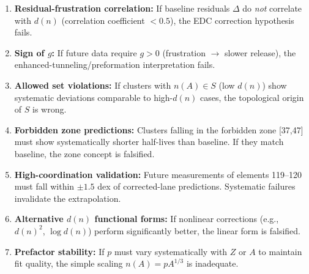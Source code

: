 \begin{edcopenbox}[title=Falsifiability Hooks]
    \begin{enumerate}
        \item \textbf{Residual-frustration correlation:}
              If baseline residuals $\Delta$ do \emph{not} correlate with
              $d(n)$ (correlation coefficient $< 0.5$), the EDC correction
              hypothesis fails.

        \item \textbf{Sign of $g$:}
              If future data require $g > 0$ (frustration $\to$ slower release),
              the enhanced-tunneling/preformation interpretation fails.

        \item \textbf{Allowed set violations:}
              If clusters with $n(A) \in S$ (low $d(n)$) show systematic
              deviations comparable to high-$d(n)$ cases, the topological
              origin of $S$ is wrong.

        \item \textbf{Forbidden zone predictions:}
              Clusters falling in the forbidden zone [37,47] must show
              systematically shorter half-lives than baseline. If they match
              baseline, the zone concept is falsified.

        \item \textbf{High-coordination validation:}
              Future measurements of elements 119--120 must fall within
              $\pm 1.5$ dex of corrected-lane predictions. Systematic
              failures invalidate the extrapolation.

        \item \textbf{Alternative $d(n)$ functional forms:}
              If nonlinear corrections (e.g., $d(n)^2$, $\log d(n)$)
              perform significantly better, the linear form is falsified.

        \item \textbf{Prefactor stability:}
              If $p$ must vary systematically with $Z$ or $A$ to maintain
              fit quality, the simple scaling $n(A) = p A^{1/3}$ is inadequate.
    \end{enumerate}
\end{edcopenbox}


